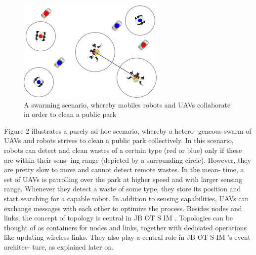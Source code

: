 \begin{figure}[hbtp]
\centering
\includegraphics[scale=1]{screenshot_5.png}
\caption{A swarming scenario, whereby mobiles robots and
UAVs collaborate in order to clean a public park}
\end{figure}

Figure 2 illustrates a purely ad hoc scenario, whereby a hetero-
geneous swarm of UAVs and robots strives to clean a public park
collectively. In this scenario, robots can detect and clean wastes
of a certain type (red or blue) only if these are within their sens-
ing range (depicted by a surrounding circle). However, they are
pretty slow to move and cannot detect remote wastes. In the mean-
time, a set of UAVs is patrolling over the park at higher speed and
with larger sensing range. Whenever they detect a waste of some
type, they store its position and start searching for a capable robot.
In addition to sensing capabilities, UAVs can exchange messages
with each other to optimize the process.
Besides nodes and links, the concept of topology is central in
JB OT S IM . Topologies can be thought of as containers for nodes
and links, together with dedicated operations like updating wireless
links. They also play a central role in JB OT S IM ’s event architec-
ture, as explained later on.

